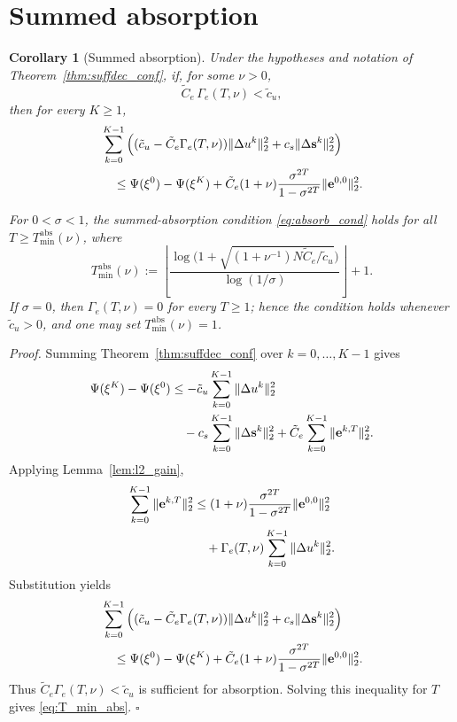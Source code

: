 \documentclass[letterpaper, 10 pt, conference]{ieeeconf} %
\newenvironment{proof}[1][Proof]{\par\noindent\textit{#1. }\ignorespaces}
  {\hfill$\square$\par}
\newtheorem{corollary}{Corollary}
\begin{document}
\section{Summed absorption}

\begin{corollary}[Summed absorption]\label{cor:absorption}
Under the hypotheses and notation of Theorem~\ref{thm:suffdec_conf}, if, for some \(\nu>0\),
\begin{equation}\label{eq:absorb_cond}
\tilde C_e\,\Gamma_e(T,\nu) < \tilde c_u,
\end{equation}
then for every \(K\ge 1\),
\begin{align}
&\sum_{k=0}^{K-1}\Big(
(\tilde c_u-\tilde C_e\Gamma_e(T,\nu))\|\Delta u^k\|_2^2
+c_s\|\Delta\mathbf s^k\|_2^2
\Big) \notag\\
&\quad\le
\Psi(\xi^0)-\Psi(\xi^K)
+\tilde C_e(1+\nu)
\frac{\sigma^{2T}}{1-\sigma^{2T}}
\|\mathbf e^{0,0}\|_2^2 .
\end{align}

For \(0<\sigma<1\), the summed-absorption condition \eqref{eq:absorb_cond} holds for all \(T\ge T_{\min}^{\mathrm{abs}}(\nu)\), where
\begin{equation}\label{eq:T_min_abs}
T_{\min}^{\mathrm{abs}}(\nu)
:=
\left\lfloor
\frac{
\log\!\bigl(
1+\sqrt{(1+\nu^{-1})N\tilde C_e/\tilde c_u}
\bigr)
}{
\log(1/\sigma)
}
\right\rfloor
+1 .
\end{equation}
If \(\sigma=0\), then \(\Gamma_e(T,\nu)=0\) for every \(T\ge1\); hence the condition holds whenever \(\tilde c_u>0\), and one may set \(T_{\min}^{\mathrm{abs}}(\nu)=1\).
\end{corollary}

\begin{proof}
Summing Theorem~\ref{thm:suffdec_conf} over \(k=0,\dots,K-1\) gives
\begin{align}
\Psi(\xi^K)-\Psi(\xi^0)
&\le
-\tilde c_u\sum_{k=0}^{K-1}\|\Delta u^k\|_2^2
\notag\\
&\quad
-c_s\sum_{k=0}^{K-1}\|\Delta\mathbf s^k\|_2^2
+\tilde C_e\sum_{k=0}^{K-1}\|\mathbf e^{k,T}\|_2^2 .
\end{align}
Applying Lemma~\ref{lem:l2_gain},
\begin{align}
\sum_{k=0}^{K-1}\|\mathbf e^{k,T}\|_2^2
&\le
(1+\nu)\frac{\sigma^{2T}}{1-\sigma^{2T}}\|\mathbf e^{0,0}\|_2^2 \notag\\
&\quad +\Gamma_e(T,\nu)\sum_{k=0}^{K-1}\|\Delta u^k\|_2^2.
\end{align}
Substitution yields
\begin{align}
&\sum_{k=0}^{K-1}\Big(
(\tilde c_u-\tilde C_e\Gamma_e(T,\nu))\|\Delta u^k\|_2^2
+c_s\|\Delta\mathbf s^k\|_2^2
\Big) \notag\\
&\quad\le
\Psi(\xi^0)-\Psi(\xi^K)
+\tilde C_e(1+\nu)\frac{\sigma^{2T}}{1-\sigma^{2T}}\|\mathbf e^{0,0}\|_2^2.
\end{align}
Thus \(\tilde C_e\Gamma_e(T,\nu)<\tilde c_u\) is sufficient for absorption. Solving this inequality for \(T\) gives \eqref{eq:T_min_abs}.
\end{proof}
\end{document}
